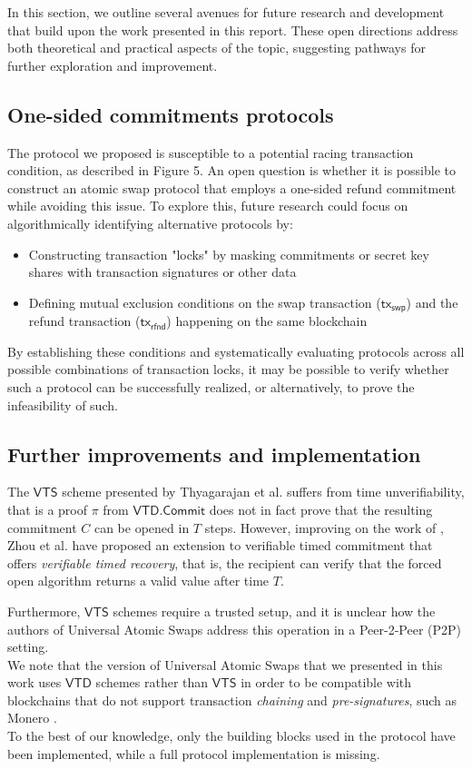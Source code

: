 \documentclass{article}      	%
\begin{document}
In this section, we outline several avenues for future research and development that build upon the work presented in this report. These open directions address both theoretical and practical aspects of the topic, suggesting pathways for further exploration and improvement.
\subsection*{One-sided commitments protocols}
The protocol we proposed is susceptible to a potential racing transaction condition, as described in Figure 5. An open question is whether it is possible to construct an atomic swap protocol that employs a one-sided refund commitment while avoiding this issue. 
To explore this, future research could focus on algorithmically identifying alternative protocols by:
\begin{itemize}
        \item Constructing transaction "locks" by masking commitments or secret key shares with transaction signatures or other data
        \item Defining mutual exclusion conditions on the swap transaction ($\mathsf{tx_{swp}}$) and the refund transaction ($\mathsf{tx_{rfnd}}$) happening on the same blockchain
\end{itemize}
By establishing these conditions and systematically evaluating protocols across all possible combinations of transaction locks, it may be possible to verify whether such a protocol can be successfully realized, or alternatively, to prove the infeasibility of such.

\subsection*{Further improvements and implementation}
The $\mathsf{VTS}$ scheme presented  by Thyagarajan et al. \cite{vts} suffers from time unverifiability, that is a proof $\pi$ from $\mathsf{VTD}.\mathsf{Commit}$ does not in fact prove that the resulting commitment $C$ can be opened in $T$ steps. However, improving on the work of \cite{vts}, Zhou et al. \cite{fixed_vts} have proposed an extension to verifiable timed commitment that offers \textit{verifiable timed recovery}, that is, the recipient can verify that the forced open algorithm returns a valid value after time $T$.

Furthermore, $\mathsf{VTS}$ schemes require a trusted setup, and it is unclear how the authors of Universal Atomic Swaps \cite{uas} address this operation in a Peer-2-Peer (P2P) setting. \\
We note that the version of Universal Atomic Swaps that we presented in this work uses $\mathsf{VTD}$ schemes rather than $\mathsf{VTS}$ in order to be compatible with blockchains that do not support transaction \textit{chaining} and \textit{pre-signatures}, such as Monero \cite{pre_sign}. \\
To the best of our knowledge, only the building blocks used in the protocol have been implemented, while a full protocol implementation is missing.
\end{document}
